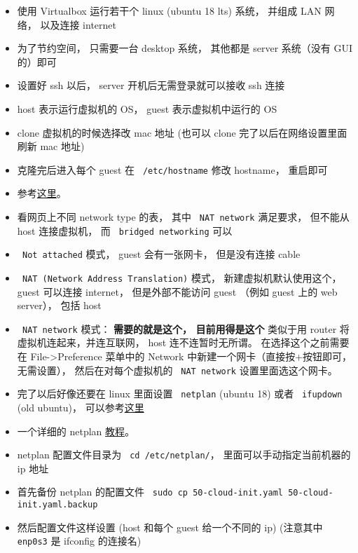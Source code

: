 \begin{itemize}
\item 使用 Virtualbox 运行若干个 linux (ubuntu 18 lts) 系统， 并组成 LAN 网络， 以及连接 internet
\item 为了节约空间， 只需要一台 desktop 系统， 其他都是 server 系统（没有 GUI 的）即可
\item 设置好 ssh 以后， server 开机后无需登录就可以接收 ssh 连接
\item host 表示运行虚拟机的 OS， guest 表示虚拟机中运行的 OS
\item clone 虚拟机的时候选择改 mac 地址 (也可以 clone 完了以后在网络设置里面刷新 mac 地址)
\item 克隆完后进入每个 guest 在 \verb` /etc/hostname` 修改 hostname， 重启即可
\item 参考\href{https://www.thomas-krenn.com/en/wiki/Network_Configuration_in_VirtualBox}{这里}。
\item 看网页上不同 network type 的表， 其中 \verb` NAT network` 满足要求， 但不能从 host 连接虚拟机， 而 \verb` bridged networking` 可以
\item \verb` Not attached` 模式， guest 会有一张网卡， 但是没有连接 cable
\item \verb` NAT (Network Address Translation)` 模式， 新建虚拟机默认使用这个， guest 可以连接 internet， 但是外部不能访问 guest （例如 guest 上的 web server）， 包括 host
\item \verb` NAT network` 模式： \textbf{需要的就是这个， 目前用得是这个} 类似于用 router 将虚拟机连起来，并连互联网， host 连不连暂时无所谓。 在选择这个之前需要在 File->Preference 菜单中的 Network 中新建一个网卡（直接按+按钮即可，无需设置）， 然后在对每个虚拟机的 \verb` NAT network` 设置里面选这个网卡。
\item 完了以后好像还要在 linux 里面设置 \verb` netplan` (ubuntu 18) 或者 \verb` ifupdown` (old ubuntu)， 可以参考\href{https://www.linux.com/tutorials/how-use-netplan-network-configuration-tool-linux/}{这里}
\item 一个详细的 netplan \href{https://linuxconfig.org/netplan-network-configuration-tutorial-for-beginners}{教程}。
\item netplan 配置文件目录为 \verb` cd /etc/netplan/`， 里面可以手动指定当前机器的 ip 地址
\item 首先备份 netplan 的配置文件 \verb` sudo cp 50-cloud-init.yaml 50-cloud-init.yaml.backup`
\item 然后配置文件这样设置 (host 和每个 guest 给一个不同的 ip) (注意其中 \verb` enp0s3` 是 ifconfig 的连接名)
\begin{lstlisting}[language=none]

\end{lstlisting}
\end{itemize}
